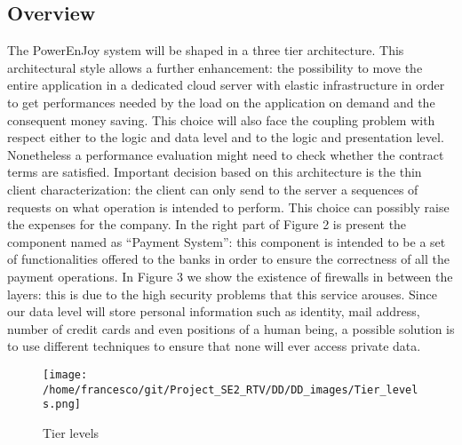 \documentclass[10pt, a4paper,titlepage]{article}
\begin{document}
\subsection{Overview}
The PowerEnJoy system will be shaped in a three tier architecture. This architectural style allows a further enhancement: the possibility to move the entire application in a dedicated cloud server with elastic infrastructure in order to get performances needed by the load on the application on demand and the consequent money saving. This choice will also face the coupling problem with respect either to the logic and data level and to the logic and presentation level. Nonetheless a performance evaluation might need to check whether the contract terms are satisfied. Important decision based on this architecture is the thin client characterization: the client can only send to the server a sequences of requests on what operation is intended to perform. This choice can possibly raise the expenses for the company. In the right part of Figure 2 is present the component named as “Payment System”: this component is intended to be a set of functionalities offered to the banks in order to ensure the correctness of all the payment operations. In Figure 3 we show the existence of firewalls in between the layers: this is due to the high security problems that this service arouses. Since our data level will store personal information such as identity, mail address, number of credit cards and even positions of a human being, a possible solution is to use different techniques to ensure that none will ever access private data.
\begin{figure}
\begin{center}
\texttt{[image: /home/francesco/git/Project\_SE2\_RTV/DD/DD\_images/Tier\_levels.png]}
\end{center}
\caption{Tier levels}
\label{fig:tier_levels}
\end{figure}
\newpage
\end{document}
